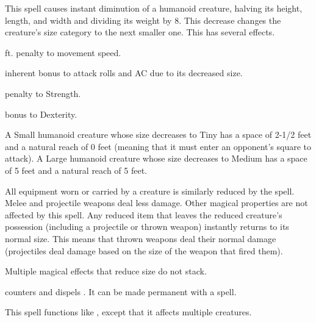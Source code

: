 \spellrng{\rngclose}
\begin{spelleffect}
  This spell causes instant diminution of a humanoid creature, halving its height, length, and width and dividing its weight by 8. This decrease changes the creature's size category to the next smaller one. This has several effects.
  \begin{itemize*} 
    \item {} ft. penalty to movement speed.
    \item {} inherent bonus to attack rolls and AC due to its decreased size.
  \item {} penalty to Strength.
  \item {} bonus to Dexterity.
  \end{itemize*}
  \par A Small humanoid creature whose size decreases to Tiny has a space of 2-1/2 feet and a natural reach of 0 feet (meaning that it must enter an opponent's square to attack). A Large humanoid creature whose size decreases to Medium has a space of 5 feet and a natural reach of 5 feet.
  \par All equipment worn or carried by a creature is similarly reduced by the spell. Melee and projectile weapons deal less damage. Other magical properties are not affected by this spell. Any reduced item that leaves the reduced creature's possession (including a projectile or thrown weapon) instantly returns to its normal size. This means that thrown weapons deal their normal damage (projectiles deal damage based on the size of the weapon that fired them).
\end{spelleffect}
\begin{spellnotes}
  Multiple magical effects that reduce size do not stack.
  \par {} counters and dispels . It can be made permanent with a  spell.
\end{spellnotes}

\spellrng{\rngmed}
\begin{spelleffect}
  This spell functions like , except that it affects multiple creatures.
\end{spelleffect}


